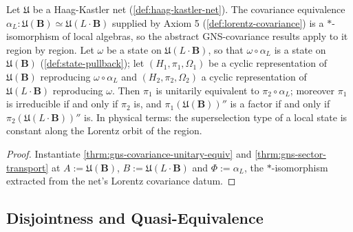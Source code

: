 \begin{theorem}
    \label{thrm:gns-covariance-local}
    \leanok
    Let $\mathfrak{U}$ be a Haag-Kastler net (\ref{def:haag-kastler-net}). The covariance equivalence $\alpha_L : \mathfrak{U}(\mathbf{B}) \simeq \mathfrak{U}(L\cdot\mathbf{B})$ supplied by Axiom 5 (\ref{def:lorentz-covariance}) is a $*$-isomorphism of local algebras, so the abstract GNS-covariance results apply to it region by region. Let $\omega$ be a state on $\mathfrak{U}(L\cdot\mathbf{B})$, so that $\omega \circ \alpha_L$ is a state on $\mathfrak{U}(\mathbf{B})$ (\ref{def:state-pullback}); let $(H_1, \pi_1, \Omega_1)$ be a cyclic representation of $\mathfrak{U}(\mathbf{B})$ reproducing $\omega \circ \alpha_L$ and $(H_2, \pi_2, \Omega_2)$ a cyclic representation of $\mathfrak{U}(L\cdot\mathbf{B})$ reproducing $\omega$. Then $\pi_1$ is unitarily equivalent to $\pi_2 \circ \alpha_L$; moreover $\pi_1$ is irreducible if and only if $\pi_2$ is, and $\pi_1(\mathfrak{U}(\mathbf{B}))''$ is a factor if and only if $\pi_2(\mathfrak{U}(L\cdot\mathbf{B}))''$ is. In physical terms: the superselection type of a local state is constant along the Lorentz orbit of the region.
\end{theorem}
\begin{proof}
    \leanok
    Instantiate \ref{thrm:gns-covariance-unitary-equiv} and \ref{thrm:gns-sector-transport} at $A := \mathfrak{U}(\mathbf{B})$, $B := \mathfrak{U}(L\cdot\mathbf{B})$ and $\Phi := \alpha_L$, the $*$-isomorphism extracted from the net's Lorentz covariance datum.
\end{proof}

\subsection{Disjointness and Quasi-Equivalence}


